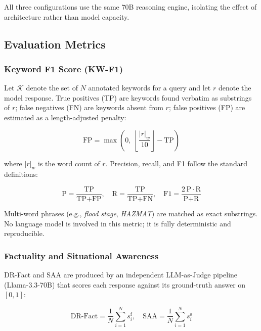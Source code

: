 All three configurations use the same 70B reasoning engine, isolating
the effect of architecture rather than model capacity.

\subsection{Evaluation Metrics}
\label{sec:metrics}

\subsubsection{Keyword F1 Score (KW-F1)}
Let $\mathcal{K}$ denote the set of $N$ annotated keywords for a
query and let $r$ denote the model response. True positives (TP) are
keywords found verbatim as substrings of $r$; false negatives (FN)
are keywords absent from $r$; false positives (FP) are estimated as
a length-adjusted penalty:

\begin{equation}
  \text{FP} = \max\!\left(0,\;\left\lfloor
    \frac{|r|_w}{10}\right\rfloor - \text{TP}\right)
  \label{eq:fp}
\end{equation}

\noindent where $|r|_w$ is the word count of $r$. Precision, recall,
and F1 follow the standard definitions:

\begin{equation}
  \text{P} = \frac{\text{TP}}{\text{TP}+\text{FP}}, \quad
  \text{R} = \frac{\text{TP}}{\text{TP}+\text{FN}}, \quad
  \text{F1} = \frac{2\,\text{P}\cdot\text{R}}{\text{P}+\text{R}}
  \label{eq:f1}
\end{equation}

\noindent Multi-word phrases (e.g., \textit{flood stage},
\textit{HAZMAT}) are matched as exact substrings. No language model
is involved in this metric; it is fully deterministic and
reproducible.

\subsubsection{Factuality and Situational Awareness}
DR-Fact and SAA are produced by an independent LLM-as-Judge
pipeline (Llama-3.3-70B) that scores each response against its
ground-truth answer on $[0,1]$:

\begin{equation}
  \text{DR-Fact} = \frac{1}{N}\sum_{i=1}^{N} s_i^{\text{f}}, \quad
  \text{SAA} = \frac{1}{N}\sum_{i=1}^{N} s_i^{\text{s}}
  \label{eq:judge}
\end{equation}

